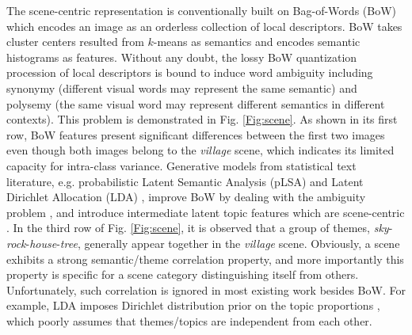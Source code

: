 \documentclass[journal]{IEEEtran}
\begin{document}
The scene-centric representation is conventionally built on Bag-of-Words (BoW) which encodes an image as an orderless collection of local descriptors. BoW takes cluster centers resulted from $k$-means as semantics and encodes semantic histograms as features. Without any doubt, the lossy BoW quantization procession of local descriptors is bound to induce word ambiguity \cite{van2010visual} including synonymy (different visual words may represent the same semantic) and polysemy (the same visual word may represent different semantics in different contexts). This problem is demonstrated in Fig. \ref{Fig:scene}. As shown in its first row, BoW features present significant differences between the first two images even though both images belong to the \emph{village} scene, which indicates its limited capacity for intra-class variance. Generative models from statistical text literature, e.g. probabilistic Latent Semantic Analysis (pLSA) \cite{hofmann1999probabilistic} and Latent Dirichlet Allocation (LDA) \cite{blei2003latent}, improve BoW by dealing with the ambiguity problem \cite{van2010visual}, and introduce intermediate latent topic features which are scene-centric \cite{fei2005bayesian, bosch2006scene, bosch2008scene}. In the third row of Fig. \ref{Fig:scene}, it is observed that a group of themes, \emph{sky}-\emph{rock}-\emph{house}-\emph{tree}, generally appear together in the \emph{village} scene. %
Obviously, a scene exhibits a strong semantic/theme correlation property, and more importantly this property is specific for a scene category distinguishing itself from others. Unfortunately, such correlation is ignored in most existing work besides BoW. For example, LDA imposes Dirichlet distribution prior on the topic proportions \cite{blei2003latent}, which poorly assumes that themes/topics are independent from each other.
\end{document}
